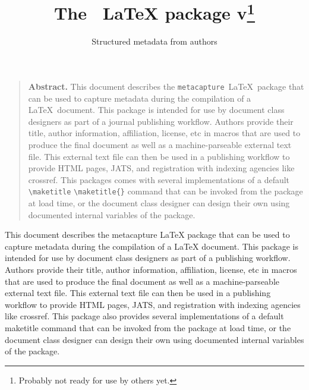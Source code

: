 \documentclass{article}
\title[plaintext={The metacapture LaTeX package},
       running={The \pkgname\ \LaTeX\ package v\pkgversion},
      ]{The \pkgname\ \textrm{\LaTeX} package v\pkgversion\footnote{Probably not ready for use by others yet.}}
\subtitle[plaintext={Structured metadata from authors}]{Structured metadata from authors}
\newcommand{\pkgname}{\texttt{metacapture}}
\newcommand{\cmd}[2][]{%
  \def\FirstArg{#1}%
  \ifx\FirstArg\empty%
    \texttt{\textbackslash{}#2}%
  \else%
    \texttt{\textbackslash{}#2\{#1\}}%
  \fi
}
\begin{document}
\hypersetup{colorlinks=true}
\maketitle
\renewenvironment{abstract}{\begin{quote}\noindent\textbf{\textsf{Abstract.}}}{\end{quote}}
\begin{abstract}
  This document describes the \pkgname\ \LaTeX\ package that can
  be used to capture metadata during the compilation of a \LaTeX\
  document. This package is intended for use by document class
  designers as part of a journal publishing workflow. Authors provide their
  title, author information, affiliation, license, etc in macros that
  are used to produce the final document as well as a
  machine-parseable external text file.  This external text file can
  then be used in a publishing workflow to provide HTML pages, JATS, and
  registration with indexing agencies like crossref. This packages comes with
  several implementations of a default \cmd{maketitle} command that
  can be invoked from the package at load time, or the document class
  designer can design their own using documented internal variables of
  the package.
\end{abstract}
\begin{textabstract}
  This document describes the metacapture LaTeX package that can
  be used to capture metadata during the compilation of a LaTeX
  document. This package is intended for use by document class
  designers as part of a publishing workflow. Authors provide their
  title, author information, affiliation, license, etc in macros that
  are used to produce the final document as well as a
  machine-parseable external text file.  This external text file can
  then be used in a publishing workflow to provide HTML pages, JATS, and
  registration with indexing agencies like crossref. This package also
  provides several implementations of a default maketitle command that
  can be invoked from the package at load time, or the document class
  designer can design their own using documented internal variables of
  the package.
\end{textabstract}

\end{document}
